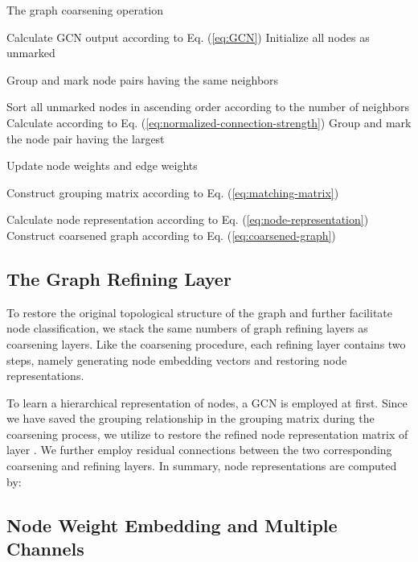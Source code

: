 \documentclass{article}
\begin{document}
\begin{algorithm}
	\caption{The graph coarsening operation}
	\label{algo:graph-coarsening-layer}
	
	Calculate GCN output  according to Eq. (\ref{eq:GCN})\;
	Initialize all nodes as unmarked\;
	
	Group and mark node pairs having the same neighbors\;
	
	Sort all unmarked nodes in ascending order according to the number of neighbors\;
	 {
		 {
			 {
				Calculate  according to Eq. (\ref{eq:normalized-connection-strength})\;
			}
			Group and mark the node pair  having the largest \;
		}
	}
	
	Update node weights and edge weights\;
	
	Construct grouping matrix  according to Eq. (\ref{eq:matching-matrix})\;
	
	Calculate node representation  according to Eq. (\ref{eq:node-representation})\;
	Construct coarsened graph  according to Eq. (\ref{eq:coarsened-graph})\;
	\Return{}
\end{algorithm}

\subsection{The Graph Refining Layer}

To restore the original topological structure of the graph and further facilitate node classification, we stack the same numbers of graph refining layers as coarsening layers. Like the coarsening procedure, each refining layer contains two steps, namely generating node embedding vectors and restoring node representations.

To learn a hierarchical representation of nodes, a GCN is employed at first. Since we have saved the grouping relationship in the grouping matrix during the coarsening process, we utilize  to restore the refined node representation matrix of layer . We further employ residual connections between the two corresponding coarsening and refining layers. In summary, node representations are computed by:


\subsection{Node Weight Embedding and Multiple Channels}
\end{document}
